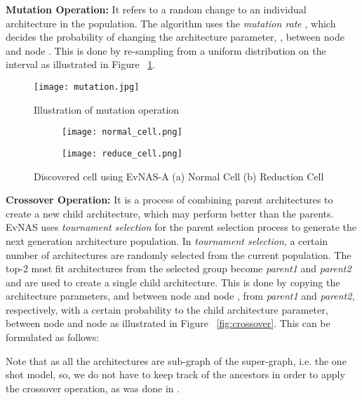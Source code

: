 \documentclass[final]{cvpr}
\begin{document}
\textbf{Mutation Operation:} It refers to a random change to an individual
architecture in the population. The algorithm uses the \textit{mutation rate}
\cite{eiben2003introduction}, which decides the probability of changing the
architecture parameter, , between
node  and node . This is done by re-sampling  from a 
uniform distribution on the interval  as illustrated in 
Figure ~\ref{fig:mutation}. 

\begin{figure}[h]
\begin{center}
       \texttt{[image: mutation.jpg]}
  \end{center}
  \caption{Illustration of mutation operation}
  \label{fig:mutation}
  \end{figure}

\begin{figure*}[t]
  \centering
\begin{subfigure}{0.45\linewidth}
    \texttt{[image: normal\_cell.png]}
    \caption{}
    \label{fig:normal}
  \end{subfigure}
  \quad \quad
  \begin{subfigure}{0.45\linewidth}
    \texttt{[image: reduce\_cell.png]}
    \caption{}
    \label{fig:reduce}
  \end{subfigure}
  \caption{Discovered cell using EvNAS-A (a) Normal Cell (b) Reduction Cell}
  \label{discovered_cells}
\end{figure*}

\textbf{Crossover Operation:} It is a process of combining parent architectures
to create a new child architecture, which may perform better than the parents.
EvNAS uses \textit{tournament selection} \cite{eiben2003introduction} for the parent
selection process to generate the next generation architecture population. In
\textit{tournament selection}, a certain number of architectures are randomly selected
from the current population. The top-2 most fit architectures from the 
selected group become \textit{parent1} and \textit{parent2} and are used to create 
a single child architecture. This is done by copying the architecture 
parameters,  and  between node  and
node , from \textit{parent1} and \textit{parent2}, respectively, with a certain probability
to the child architecture parameter,  between node  and node 
as illustrated in Figure ~\ref{fig:crossover}. This can be formulated as follows:
    
Note that as all the architectures are sub-graph of the super-graph, i.e. the one shot
model, so, we do not have to keep track of the ancestors in order to apply the crossover
operation, as was done in \cite{zhu2019eena}\cite{stanley2002evolving}.
\end{document}

